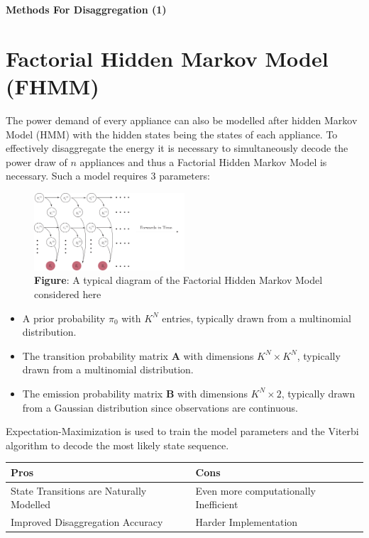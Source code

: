 \documentclass[landscape,fontscale=0.48,margin=2cm,paperwidth=135truecm,paperheight=89truecm]{baposter}
\begin{document}
\begin{poster}
\begin{posterbox}[column=1, height = bottom]{\LARGE \bfseries Methods For Disaggregation (1)}
\section*{Factorial Hidden Markov Model (FHMM)}
The power demand of every appliance can also be modelled after hidden Markov Model (HMM) \cite{NILMTK} with the hidden states being the states of each appliance. To effectively disaggregate the energy it is necessary to simultaneously decode the power draw of $n$ appliances and thus a Factorial Hidden Markov Model is necessary. Such a model requires 3 parameters:
%
\begin{figure}
\begin{center}
\includegraphics[width=0.5\textwidth]{FHMM}
\caption*{\footnotesize  \textbf{Figure}: A typical diagram of the Factorial Hidden Markov Model considered here \cite{REDD}} \vspace*{-1 cm}
\end{center}
\end{figure}

\vspace{1em}
\begin{itemize}
    \setlength\itemsep{0.2em}
  \item A prior probability $\pi_0$ with $K^N$ entries, typically drawn from a multinomial distribution. 
  \item The transition probability matrix $\boldsymbol{A}$ with dimensions $K^N\times K^N$, typically drawn from a multinomial distribution.
  \item The emission probability matrix $\boldsymbol{B}$ with dimensions $K^N\times 2$, typically drawn from a Gaussian distribution since observations are continuous. 
\end{itemize}
Expectation-Maximization is used to train the model parameters and the Viterbi algorithm to decode the most likely state sequence.

\vspace{1em}
\begin{tabularx}{\linewidth}{X|X}
  \hline
  \bf Pros & \bf Cons \\
  \hline
  \small State Transitions are Naturally Modelled & \small Even more computationally Inefficient\\
  \small Improved Disaggregation Accuracy & \small Harder Implementation\\
  \hline
\end{tabularx}


\end{posterbox}
\end{poster}
\end{document}

